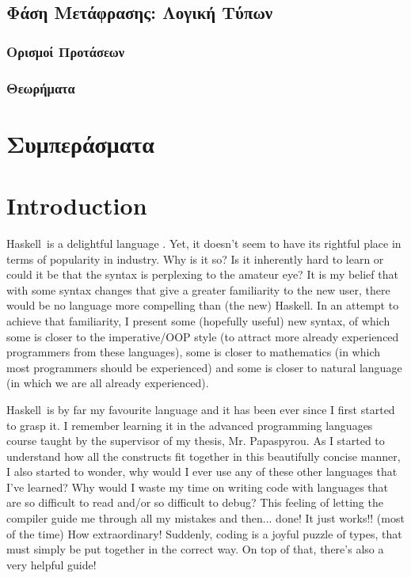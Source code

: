 \documentclass[diploma]{softlab-thesis}
\def\H{Haskell}
\begin{document}
\newpage

\section{Φάση Μετάφρασης: Λογική Τύπων}

\subsection{Ορισμοί Προτάσεων}

\subsection{Θεωρήματα}

\chapter{Συμπεράσματα}

\englishtext

\chapter{Introduction}

\H\ is a delightful language \cite{marlow2010haskell}.
Yet, it doesn't seem to have its rightful place
in terms of popularity in industry. Why is it so?  Is it inherently hard to
learn or could it be that the syntax is perplexing to the amateur eye? It is
my belief that with some syntax changes that give a greater familiarity to the
new user, there would be no language more compelling than (the new) \H. In an
attempt to achieve that familiarity, I present some (hopefully useful) new
syntax, of which some is closer to the imperative/OOP style (to attract more
already experienced programmers from these languages), some is closer to
mathematics (in which most programmers should be experienced) and some is
closer to natural language (in which we are all already experienced).

\H\ is by far my favourite language and it has been ever since I first started
to grasp it. I remember learning it in the advanced programming languages
course taught by the supervisor of my thesis, Mr. Papaspyrou. As I started
to understand how all the constructs fit together in this beautifully concise
manner, I also started to wonder, why would I ever use any of these other
languages that I've learned? Why would I waste my time on writing code
with languages that are so difficult to read and/or so difficult to debug?
This feeling of letting the compiler guide me through all my mistakes and
then... done! It just works!! (most of the time) How extraordinary! Suddenly,
coding is a joyful puzzle of types, that must simply be put together
in the correct way. On top of that, there's also a very helpful guide!
\end{document}
